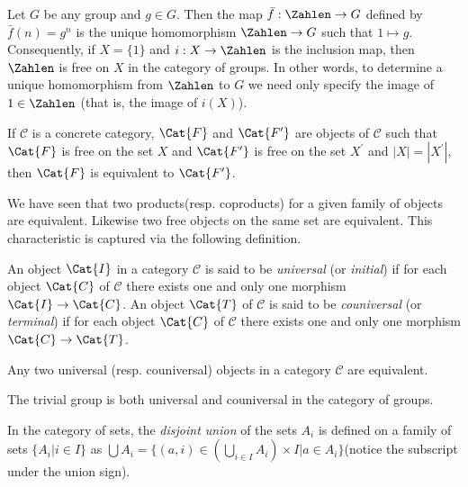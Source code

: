 \begin{Example}
	Let $ G $ be any group and $ g \in G $. Then the map $ \bar{f}:\Zahlen \to G $ defined by $ \bar{f}(n)=g^n $ is the unique homomorphism $ \Zahlen \to G $ such that $ 1 \mapsto g $. Consequently, if $ X = \{1\} $ and $ i:X \to \Zahlen $ is the inclusion map, then $ \Zahlen $ is free on $ X $ in the category of groups. In other words, to determine a unique homomorphism from $ \Zahlen $ to $ G $ we need only specify the image of $ 1 \in \Zahlen $ (that is, the image of $ i(X) $).
\end{Example}
\begin{Theorem}
	If $ \mathscr{C} $ is a concrete category, $ \Cat{F} $ and $ \Cat{F^\prime} $ are objects of $ \mathscr{C} $ such that $ \Cat{F} $ is free on the set $ X $ and $ \Cat{F^\prime} $ is free on the set $ X^\prime $ and $ |X|=|X^\prime| $, then $ \Cat{F} $ is equivalent to $ \Cat{F^\prime} $.
\end{Theorem}
We have seen that two products(resp. coproducts) for a given family of objects are equivalent. Likewise two free objects on the same set are equivalent. This characteristic is captured via the following definition.
\begin{Definition}
	An object $ \Cat{I} $ in a category $ \mathscr{C} $ is said to be \textit{universal} (or \textit{initial}) if for each object $ \Cat{C} $ of $ \mathscr{C} $ there exists one and only one morphism $ \Cat{I} \to \Cat{C} $. An object $ \Cat{T} $ of $ \mathscr{C} $ is said to be \textit{couniversal} (or \textit{terminal}) if for each object $ \Cat{C} $ of $ \mathscr{C} $ there exists one and only one morphism $ \Cat{C} \to \Cat{T} $. 
\end{Definition}
\begin{Theorem}
	Any two universal (resp. couniversal) objects in a category $ \mathscr{C} $ are equivalent.
\end{Theorem}
\begin{Example}
	The trivial group is both universal and couniversal in the category of groups.
\end{Example}
\begin{Definition}
	In the category of sets, the \textit{disjoint union} of the sets $ A_i $ is defined on a family of sets $ \{A_i | i \in I \} $ as $ \bigcup A_i=\{(a,i)\in (\bigcup_{i \in I}A_i) \times I|a\in A_i \} $(notice the subscript under the union sign).
\end{Definition}




